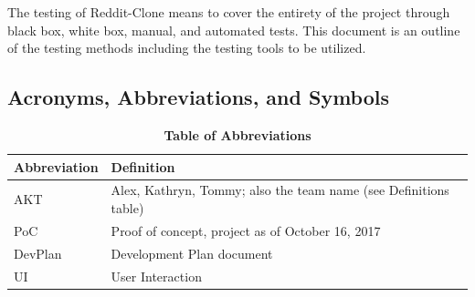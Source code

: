 \documentclass[12pt,fleqn]{article}
\begin{document}
The testing of Reddit-Clone means to cover the entirety of the project through black box, white box, manual, and automated tests.  This document is an outline of the testing methods including the testing tools to be utilized.

\subsection {Acronyms, Abbreviations, and Symbols}

\begin{table}[ht]
\caption{\textbf{Table of Abbreviations}} \label{Abbreviations}
\begin{tabularx}{\textwidth}{p{3cm}X}
\toprule
\textbf{Abbreviation} & \textbf{Definition} \\
\midrule
AKT & Alex, Kathryn, Tommy; also the team name (see Definitions table)\\
PoC & Proof of concept, project as of October 16, 2017\\
DevPlan & Development Plan document \\
UI & User Interaction \\
\bottomrule
\end{tabularx}
\end{table}
\end{document}
